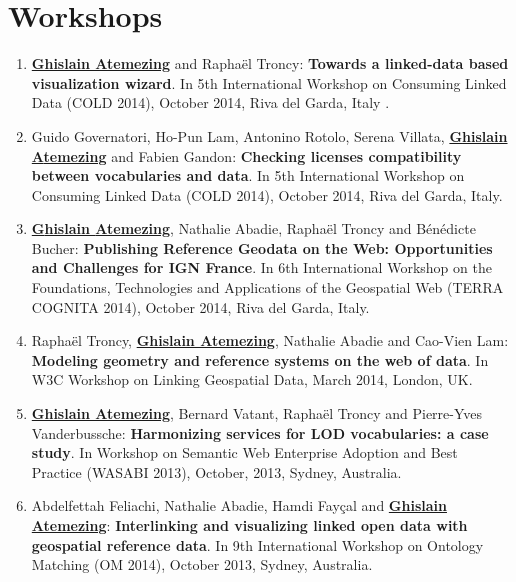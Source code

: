 \section*{Workshops}\label{sec:workshop}

\begin{enumerate}

\item \underline{\textbf{Ghislain Atemezing}} and Rapha{\"e}l Troncy: \textbf{{T}owards a linked-data based visualization wizard}. In 5th {I}nternational {W}orkshop on {C}onsuming {L}inked {D}ata (COLD 2014), {O}ctober 2014, {R}iva del {G}arda, {I}taly .

 \item {G}uido {G}overnatori, {H}o-{P}un {L}am, {A}ntonino {R}otolo, {S}erena {V}illata, \underline{\textbf{{G}hislain {A}temezing}} and {F}abien {G}andon: \textbf{{C}hecking licenses compatibility between vocabularies and data}. In 5th {I}nternational {W}orkshop on {C}onsuming {L}inked {D}ata (COLD 2014), {O}ctober 2014, {R}iva del {G}arda, {I}taly.

 \item \underline{\textbf{{G}hislain {A}temezing}}, {N}athalie {A}badie, {R}apha{\"e}l {T}roncy and {B}{\'e}n{\'e}dicte {B}ucher: \textbf{{P}ublishing Reference Geodata on the Web: {O}pportunities and Challenges for {IGN} {F}rance}. In 6th {I}nternational {W}orkshop on the {F}oundations, {T}echnologies and {A}pplications of the {G}eospatial {W}eb (TERRA COGNITA 2014), {O}ctober 2014, {R}iva del {G}arda, {I}taly.
 \item Rapha{\"e}l Troncy, \underline{\textbf{Ghislain Atemezing}}, Nathalie Abadie and Cao-Vien Lam: \textbf{Modeling geometry and reference systems on the web of data}. In W3C Workshop on Linking Geospatial Data, March 2014, London, UK.

 \item \underline{\textbf{Ghislain Atemezing}}, Bernard Vatant, Rapha{\"e}l Troncy and Pierre-Yves Vanderbussche: \textbf{Harmonizing services for LOD vocabularies: a case study}. In Workshop on Semantic Web Enterprise Adoption and Best Practice (WASABI 2013), October, 2013, Sydney, Australia.

 \item Abdelfettah Feliachi, Nathalie Abadie, Hamdi Fay\c cal and \underline{\textbf{Ghislain Atemezing}}: \textbf{{I}nterlinking and visualizing linked open data with geospatial reference data}. In 9th International Workshop on Ontology Matching (OM 2014), October 2013, Sydney, Australia.


\end{enumerate}

